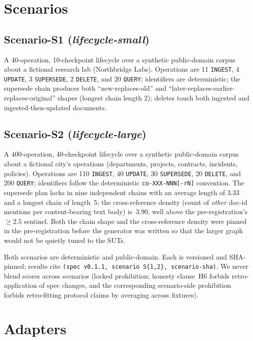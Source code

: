 \documentclass[11pt,a4paper]{article}
\begin{document}
\section{Scenarios}
\label{sec:scenario}

\subsection{Scenario-S1 (\emph{lifecycle-small})}
A 40-operation, 10-checkpoint lifecycle over a synthetic public-domain corpus about a fictional research lab (Northbridge Labs). Operations are 11 \texttt{INGEST}, 4 \texttt{UPDATE}, 3 \texttt{SUPERSEDE}, 2 \texttt{DELETE}, and 20 \texttt{QUERY}; identifiers are deterministic; the supersede chain produces both ``new-replaces-old'' and ``later-replaces-earlier-replaces-original'' shapes (longest chain length 2); deletes touch both ingested and ingested-then-updated documents.

\subsection{Scenario-S2 (\emph{lifecycle-large})}
A 400-operation, 40-checkpoint lifecycle over a synthetic public-domain corpus about a fictional city's operations (departments, projects, contracts, incidents, policies). Operations are 110 \texttt{INGEST}, 40 \texttt{UPDATE}, 30 \texttt{SUPERSEDE}, 20 \texttt{DELETE}, and 200 \texttt{QUERY}; identifiers follow the deterministic \texttt{co-XXX-NNN[-rN]} convention. The supersede plan locks in nine independent chains with an average length of $3.33$ and a longest chain of length~5; the cross-reference density (count of \emph{other} doc-id mentions per content-bearing text body) is~$3.90$, well above the pre-registration's $\ge 2.5$ sentinel. Both the chain shape and the cross-reference density were pinned in the pre-registration before the generator was written so that the larger graph would not be quietly tuned to the SUTs.

Both scenarios are deterministic and public-domain. Each is versioned and SHA-pinned; results cite \texttt{(spec~v0.1.1, scenario~S\{1,2\}, scenario-sha)}. We never blend scores across scenarios (locked prohibition; honesty clause~H6 forbids retro-application of spec changes, and the corresponding scenario-side prohibition forbids retro-fitting protocol claims by averaging across fixtures).

\section{Adapters}
\label{sec:adapters}
\end{document}
